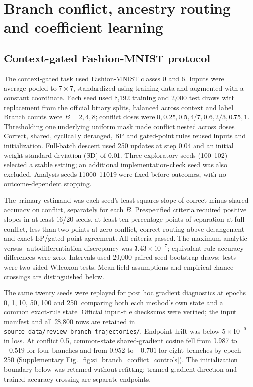\section{Branch conflict, ancestry routing and coefficient learning}
\label{note:conflict_ancestry}

\subsection{Context-gated Fashion-MNIST protocol}

The context-gated task used Fashion-MNIST classes 0 and 6. Inputs were
average-pooled to $7\times7$, standardized using training data and augmented
with a constant coordinate. Each seed used
8,192 training and 2,000 test draws with replacement from the official binary
splits, balanced across context and label. Branch counts were $B=2,4,8$;
conflict doses were $0,0.25,0.5,4/7,0.6,2/3,0.75,1$. Thresholding one
underlying uniform mask made conflict nested across doses. Correct, shared,
cyclically deranged, BP and gated-point rules reused inputs and initialization.
Full-batch descent used 250 updates at step 0.04 and an initial weight
standard deviation (SD) of 0.01.
Three exploratory seeds (100--102) selected a stable setting; an additional
implementation-check seed was also excluded. Analysis seeds 11000--11019
were fixed before outcomes, with no outcome-dependent stopping.

The primary estimand was each seed's least-squares slope of
correct-minus-shared accuracy on conflict, separately for each $B$.
Prespecified criteria required positive slopes in at least 16/20 seeds,
at least ten percentage points of separation at full conflict, less than
two points at zero conflict, correct routing above derangement and exact
BP/gated-point agreement. All criteria passed. The maximum analytic-versus-
autodifferentiation discrepancy was $3.43\times10^{-7}$; equivalent-rule
accuracy differences were zero. Intervals used 20,000 paired-seed bootstrap
draws; tests were two-sided Wilcoxon tests. Mean-field assumptions and empirical
chance crossings are distinguished below.

The same twenty seeds were replayed for post hoc gradient diagnostics at epochs 0, 1, 10, 50, 100 and 250, comparing both each method's own state and a common exact-rule state. Official input-file checksums were verified; the input manifest and all 28,800 rows are retained in \texttt{source\_data/review\_branch\_trajectories/}. Endpoint drift was below $5\times10^{-9}$ in loss. At conflict 0.5, common-state shared-gradient cosine fell from 0.987 to $-0.519$ for four branches and from 0.952 to $-0.701$ for eight branches by epoch 250 (Supplementary Fig.~\ref{fig:si_branch_conflict_controls}). The initialization boundary below was retained without refitting; trained gradient direction and trained accuracy crossing are separate endpoints.

